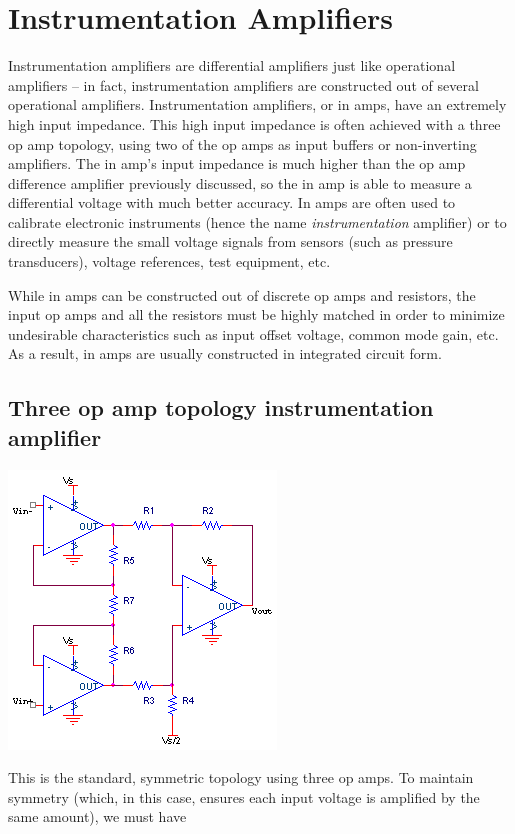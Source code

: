 \chapter{Instrumentation Amplifiers}

Instrumentation amplifiers are differential amplifiers just like operational amplifiers -- in fact, instrumentation amplifiers are constructed out of several operational amplifiers.
Instrumentation amplifiers, or in amps, have an extremely high input impedance.
This high input impedance is often achieved with a three op amp topology, using two of the op amps as input buffers or non-inverting amplifiers.
The in amp's input impedance is much higher than the op amp difference amplifier previously discussed, so the in amp is able to measure a differential voltage with much better accuracy.
In amps are often used to calibrate electronic instruments (hence the name \textit{instrumentation} amplifier) or to directly measure the small voltage signals from sensors (such as pressure transducers), voltage references, test equipment, etc.

While in amps can be constructed out of discrete op amps and resistors, the input op amps and all the resistors must be highly matched in order to minimize undesirable characteristics such as input offset voltage, common mode gain, etc.
As a result, in amps are usually constructed in integrated circuit form.

\section{Three op amp topology instrumentation amplifier}
\begin{center}
	\includegraphics{schematics/threeinamp.PNG}
\end{center}
This is the standard, symmetric topology using three op amps.
To maintain symmetry (which, in this case, ensures each input voltage is amplified by the same amount), we must have

